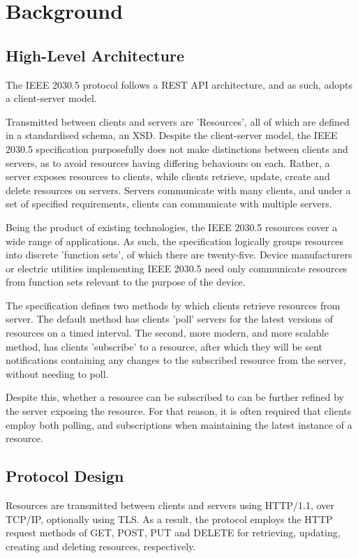 \chapter{Background}\label{ch:background}

\section{High-Level Architecture}
The IEEE 2030.5 protocol follows a REST API architecture, and as such, adopts a client-server model.

Transmitted between clients and servers are 'Resources', all of which are defined in a standardised schema, an XSD. 
Despite the client-server model, the IEEE 2030.5 specification purposefully does not make distinctions between clients and servers, as to avoid resources having differing behaviours on each. Rather, a server exposes resources to clients, while clients retrieve, update, create and delete resources on servers.
Servers communicate with many clients, and under a set of specified requirements, clients can communicate with multiple servers.

Being the product of existing technologies, the IEEE 2030.5 resources cover a wide range of applications. As such, the specification logically groups resources into discrete 'function sets', of which there are twenty-five. 
Device manufacturers or electric utilities implementing IEEE 2030.5 need only communicate resources from function sets relevant to the purpose of the device. 

The specification defines two methods by which clients retrieve resources from server. The default method has clients 'poll' servers for the latest versions of resources on a timed interval.
The second, more modern, and more scalable method, has clients 'subscribe' to a resource, after which they will be sent notifications containing any changes to the subscribed resource from the server, without needing to poll.

Despite this, whether a resource can be subscribed to can be further refined by the server exposing the resource.
For that reason, it is often required that clients employ both polling, and subscriptions when maintaining the latest instance of a resource. \cite{AUSDOE} 
\cite{IEEE2030.5}

\section{Protocol Design}
Resources are transmitted between clients and servers using HTTP/1.1, over TCP/IP, optionally using TLS.
As a result, the protocol employs the HTTP request methods of GET, POST, PUT and DELETE for retrieving, updating, creating and deleting resources, respectively.

